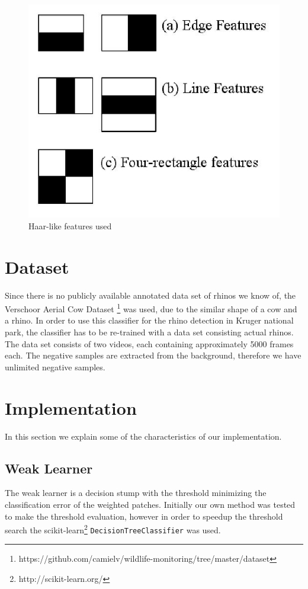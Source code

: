 \documentclass[11pt]{article}
\begin{document}
\begin{figure}[htp]
\centering
\includegraphics[scale=0.380]{res/haar.JPG}
\caption{Haar-like features used}
\label{haar_img}
\end{figure}

\section{Dataset}
Since there is no publicly available annotated data set of rhinos we know of, the Verschoor Aerial Cow Dataset \footnote{https://github.com/camielv/wildlife-monitoring/tree/master/dataset} was used, due to the similar shape of a cow and a rhino. In order to use this classifier for the rhino detection in Kruger national park, the classifier has to be re-trained with a data set consisting actual rhinos.\\
The data set consists of two videos, each containing approximately 5000 frames each. The negative samples are extracted from the background, therefore we have unlimited negative samples.

\section{Implementation}
In this section we explain some of the characteristics of our implementation.
\subsection{Weak Learner}
The weak learner is a decision stump with the threshold minimizing the classification error of the weighted patches. Initially our own method was tested to make the threshold evaluation, however in order to speedup the threshold search the scikit-learn\footnote{http://scikit-learn.org/} \texttt{DecisionTreeClassifier} was used.
\end{document}
